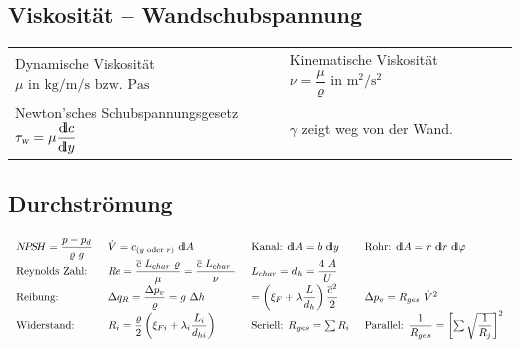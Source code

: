 \subsection{Viskosität -- Wandschubspannung}
	\begin{center}
		\setlength{\tabcolsep}{2em} %
		\begin{tabular}{ll}
		      Dynamische Viskosität $ \mu \text{ in } \unit{\kg\per\m\per\s} \text{ bzw. } \unit{\Pa\s} $
			& Kinematische Viskosität $ \nu = \dfrac{\mu}{\varrho} \text{ in } \unit{\m\squared \per\s\squared} $
			\\
			  Newton'sches Schubspannungsgesetz $ \tau_{\textsl{w}} = \mu \dfrac{{\operatorname{d\!l}} c}{{\operatorname{d\!l}} y} $ 
			& $\gamma$ zeigt weg von der Wand.
		\end{tabular}
	\end{center}

\subsection{Durchströmung}
	\setlength{\abovedisplayskip}{-15pt}
	\[ \arraycolsep=0.7em
		\begin{array}{llll}
			N\!P\!S\!H = \dfrac{p - p_d}{\varrho\ g} & \dot{V} = c_{(y \text{ oder } r)} \ \dd A                                                    & \text{Kanal: } \dd A = b\ \dd y                                          & \text{Rohr: } \dd A = r\ \dd r\ \dd\varphi \\
			\text{Reynolds Zahl:}                    & \Reyn = \dfrac{\overline{c}\ L_{char}\ \varrho}{\mu} = \dfrac{\overline{c}\ L_{char}\ }{\nu} & L_{char} = d_h = \dfrac{4\ A}{U}                                         &                                             \\
			\text{Reibung:}                          & \Delta q_R = \dfrac{\Delta p_v}{\varrho} = g\ \Delta h                                       & = \left(\xi_F + \lambda \dfrac{L}{d_h} \right) \dfrac{\overline{c}^2}{2} & \Delta p_v = R_{ges}\ \dot{V}^2             \\
			\text{Widerstand:}                       & R_i = \dfrac{\varrho}{2}  \left(\xi_{Fi} + \lambda_i \dfrac{L_i}{d_{hi}}\right)              & \text{Seriell: } R_{ges} = \sum R_i  & \text{Parallel: } \dfrac{1}{R_{ges}} = \left[\sum\sqrt{\dfrac{1}{R_j}}\right]^2
		\end{array} 
	\]
